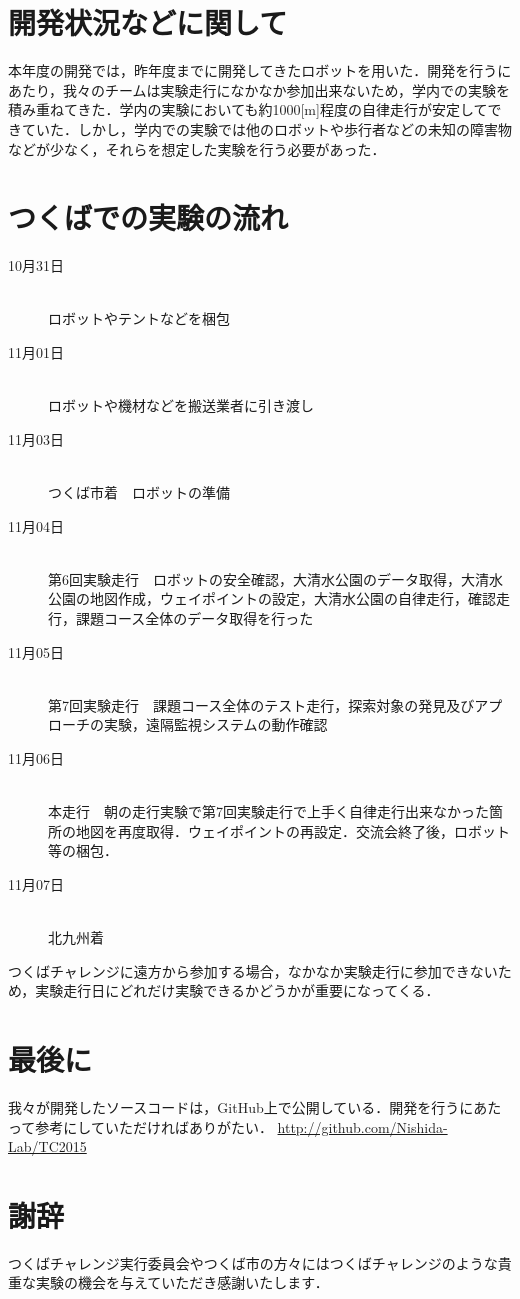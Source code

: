 \documentclass[10pt,a4paper]{jarticle}
\begin{document}
\section{開発状況などに関して}
本年度の開発では，昨年度までに開発してきたロボットを用いた．開発を行うにあたり，我々のチームは実験走行になかなか参加出来ないため，学内での実験を積み重ねてきた．学内の実験においても約1000[m]程度の自律走行が安定してできていた．しかし，学内での実験では他のロボットや歩行者などの未知の障害物などが少なく，それらを想定した実験を行う必要があった．

\section{つくばでの実験の流れ}
\begin{description}
 \item[10月31日]\mbox{}\\
	    ロボットやテントなどを梱包
 \item[11月01日]\mbox{}\\
	    ロボットや機材などを搬送業者に引き渡し
 \item[11月03日]\mbox{}\\
	    つくば市着　ロボットの準備
 \item[11月04日]\mbox{}\\
	    第6回実験走行　ロボットの安全確認，大清水公園のデータ取得，大清水公園の地図作成，ウェイポイントの設定，大清水公園の自律走行，確認走行，課題コース全体のデータ取得を行った
 \item[11月05日]\mbox{}\\
	    第7回実験走行　課題コース全体のテスト走行，探索対象の発見及びアプローチの実験，遠隔監視システムの動作確認
 \item[11月06日]\mbox{}\\
	    本走行　朝の走行実験で第7回実験走行で上手く自律走行出来なかった箇所の地図を再度取得．ウェイポイントの再設定．交流会終了後，ロボット等の梱包．
 \item[11月07日]\mbox{}\\
	    北九州着
\end{description}
つくばチャレンジに遠方から参加する場合，なかなか実験走行に参加できないため，実験走行日にどれだけ実験できるかどうかが重要になってくる．

\section{最後に}
我々が開発したソースコードは，GitHub上で公開している．開発を行うにあたって参考にしていただければありがたい．
\url{http://github.com/Nishida-Lab/TC2015}

\section*{謝辞}
つくばチャレンジ実行委員会やつくば市の方々にはつくばチャレンジのような貴重な実験の機会を与えていただき感謝いたします．
\end{document}
